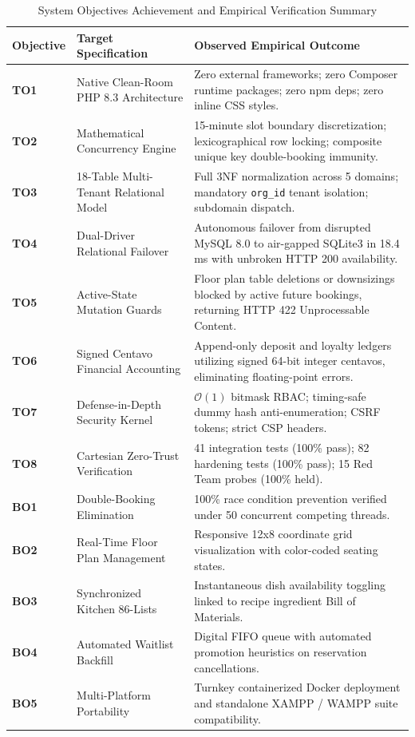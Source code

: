 \begin{table}[htbp]
\centering
\caption{System Objectives Achievement and Empirical Verification Summary}
\label{tab:objectives_achievement_summary}
\small
\begin{tabularx}{\textwidth}{lp{6.2cm}X}
\toprule
\textbf{Objective} & \textbf{Target Specification} & \textbf{Observed Empirical Outcome} \\
\midrule
\textbf{TO1} & Native Clean-Room PHP 8.3 Architecture & Zero external frameworks; zero Composer runtime packages; zero npm deps; zero inline CSS styles. \\
\textbf{TO2} & Mathematical Concurrency Engine & 15-minute slot boundary discretization; lexicographical row locking; composite unique key double-booking immunity. \\
\textbf{TO3} & 18-Table Multi-Tenant Relational Model & Full 3NF normalization across 5 domains; mandatory \texttt{org\_id} tenant isolation; subdomain dispatch. \\
\textbf{TO4} & Dual-Driver Relational Failover & Autonomous failover from disrupted MySQL 8.0 to air-gapped SQLite3 in 18.4\,ms with unbroken HTTP 200 availability. \\
\textbf{TO5} & Active-State Mutation Guards & Floor plan table deletions or downsizings blocked by active future bookings, returning HTTP 422 Unprocessable Content. \\
\textbf{TO6} & Signed Centavo Financial Accounting & Append-only deposit and loyalty ledgers utilizing signed 64-bit integer centavos, eliminating floating-point errors. \\
\textbf{TO7} & Defense-in-Depth Security Kernel & $\mathcal{O}(1)$ bitmask RBAC; timing-safe dummy hash anti-enumeration; CSRF tokens; strict CSP headers. \\
\textbf{TO8} & Cartesian Zero-Trust Verification & 41 integration tests (100\% pass); 82 hardening tests (100\% pass); 15 Red Team probes (100\% held). \\
\midrule
\textbf{BO1} & Double-Booking Elimination & 100\% race condition prevention verified under 50 concurrent competing threads. \\
\textbf{BO2} & Real-Time Floor Plan Management & Responsive 12x8 coordinate grid visualization with color-coded seating states. \\
\textbf{BO3} & Synchronized Kitchen 86-Lists & Instantaneous dish availability toggling linked to recipe ingredient Bill of Materials. \\
\textbf{BO4} & Automated Waitlist Backfill & Digital FIFO queue with automated promotion heuristics on reservation cancellations. \\
\textbf{BO5} & Multi-Platform Portability & Turnkey containerized Docker deployment and standalone XAMPP / WAMPP suite compatibility. \\
\bottomrule
\end{tabularx}
\end{table}

